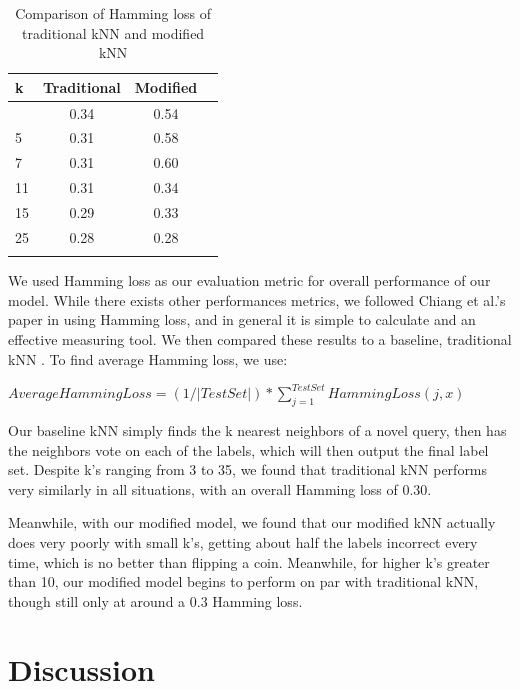 \documentclass{article}
\begin{document}
\begin{table}[t]
\caption{Comparison of Hamming loss of traditional kNN and modified kNN}
\label{sample-table}
\vskip 0.15in
\begin{center}
\begin{small}
\begin{sc}
\begin{tabular}{lccr}
\hline
\abovespace\belowspace
k & Traditional & Modified \\
\hline
\abovespace
3    & 0.34 & 0.54 \\
5    & 0.31 & 0.58\\
7    & 0.31 & 0.60 \\
11    & 0.31 & 0.34 \\
15     & 0.29 & 0.33\\
25      & 0.28 & 0.28 \\
\belowspace
\end{tabular}
\end{sc}
\end{small}
\end{center}
\vskip -0.1in
\end{table}

We used Hamming loss as our evaluation metric for overall performance of our model. While there exists other performances metrics, we followed Chiang et al.'s paper in using Hamming loss, and in general it is simple to calculate and an effective measuring tool. We then compared these results to a baseline, traditional kNN . To find average Hamming loss, we use:

$AverageHammingLoss = (1/|TestSet|) * \sum_{j=1}^{TestSet} HammingLoss(j,x) $

Our baseline kNN simply finds the k nearest neighbors of a novel query, then has the neighbors vote on each of the labels, which will then output the final label set. Despite k's ranging from 3 to 35, we found that traditional kNN performs very similarly in all situations, with an overall Hamming loss of 0.30.

Meanwhile, with our modified model, we found that our modified kNN actually does very poorly with small k's, getting about half the labels incorrect every time, which is no better than flipping a coin. Meanwhile, for higher k's greater than 10, our modified model begins to perform on par with traditional kNN, though still only at around a 0.3 Hamming loss.

\section{Discussion}
\label{discussion}
\end{document}
